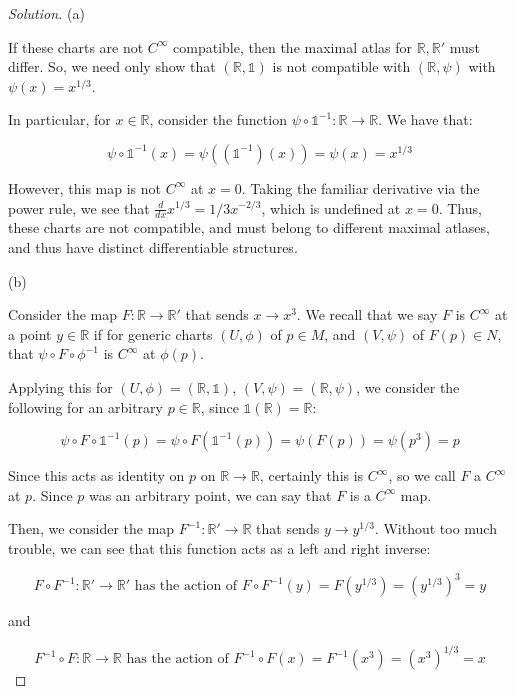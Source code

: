 \documentclass[10pt]{article}
\begin{document}
\begin{proof}[Solution]

(a)

If these charts are not $C^\infty$ compatible, then the maximal atlas for $\mathbb{R}, \mathbb{R}'$ must differ. So, we need only show that $(\mathbb{R}, \mathds{1})$ is not compatible with $(\mathbb{R}, \psi)$ with $\psi(x) = x^{1/3}$. 

In particular, for $x\in \mathbb{R}$, consider the function $\psi \circ \mathds{1}^{-1}: \mathbb{R} \to \mathbb{R}$. We have that:

$$ \psi \circ \mathds{1}^{-1} (x) =  \psi((\mathds{1}^{-1})(x)) =  \psi(x) = x^{1/3}$$

However, this map is not $C^\infty$ at $x = 0$. Taking the familiar derivative via the power rule, we see that $\frac{d}{dx} x^{1/3} = 1/3 x^{-2/3}$, which is undefined at $x = 0$. Thus, these charts are not compatible, and must belong to different maximal atlases, and thus have distinct differentiable structures.

(b)

Consider the map $F: \mathbb{R} \to \mathbb{R}'$ that sends $x \to x^3$. We recall that we say $F$ is $C^\infty$ at a point $y \in \mathbb{R}$ if for generic charts $(U, \phi)$ of $p \in M$, and $(V, \psi)$ of $F(p) \in N$, that $\psi \circ F \circ  \phi^{-1}$ is $C^\infty$ at $\phi(p)$.

Applying this for $(U, \phi) = (\mathbb{R}, \mathds{1})$, $(V, \psi) = (\mathbb{R}, \psi)$, we consider the following for an arbitrary $p \in \mathbb{R}$, since $\mathds{1} (\mathbb{R}) = \mathbb{R}$:

$$ \psi \circ F \circ \mathds{1}^{-1} (p) = \psi \circ F (\mathds{1}^{-1}(p)) = \psi(F(p)) = \psi(p^3) = p $$

Since this acts as identity on $p$ on $\mathbb{R} \to \mathbb{R}$, certainly this is $C^\infty$, so we call $F$ a $C^\infty$ at $p$. Since $p$ was an arbitrary point, we can say that $F$ is a $C^\infty$ map.

Then, we consider the map $F^{-1}: \mathbb{R}' \to \mathbb{R}$ that sends $y \to y^{1/3}$. Without too much trouble, we can see that this function acts as a left and right inverse:

$$F \circ F^{-1}: \mathbb{R}' \to \mathbb{R}' \text{ has the action of } F \circ F^{-1}(y) = F(y^{1/3}) = (y^{1/3})^3 = y$$

and

$$ F^{-1} \circ F: \mathbb{R} \to \mathbb{R} \text{ has the action of } F^{-1} \circ F(x) = F^{-1}(x^3) = (x^3)^{1/3} = x$$


\end{proof}
\end{document}
